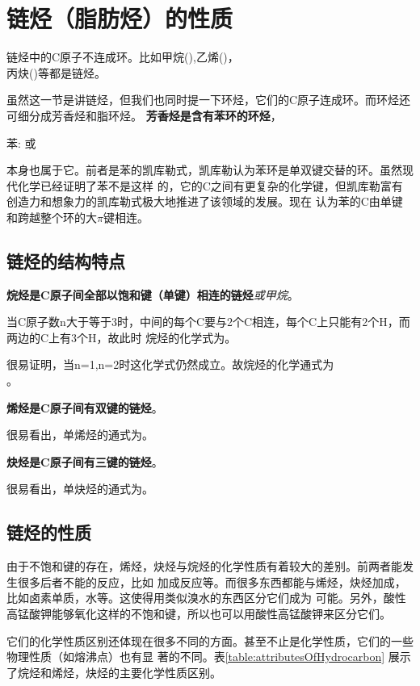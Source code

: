 \section{链烃（脂肪烃）的性质}
链烃中的C原子不连成环。比如甲烷(),乙烯()，\\
丙炔()等都是链烃。

虽然这一节是讲链烃，但我们也同时提一下环烃，它们的C原子连成环。而环烃还可细分成芳香烃和脂环烃。
\textbf{芳香烃是含有苯环的环烃}，
\begin{center}
苯:  或 
\end{center}
本身也属于它。前者是苯的凯库勒式，凯库勒认为苯环是单双键交替的环。虽然现代化学已经证明了苯不是这样
的，它的C之间有更复杂的化学键，但凯库勒富有创造力和想象力的凯库勒式极大地推进了该领域的发展。现在
认为苯的C由单键和跨越整个环的大$\pi$键相连。

\subsection{链烃的结构特点}
\textbf{烷烃是C原子间全部以饱和键（单键）相连的链烃}\emph{或甲烷}。

当C原子数n大于等于3时，中间的每个C要与2个C相连，每个C上只能有2个H，而两边的C上有3个H，故此时
烷烃的化学式为。

很易证明，当n=1,n=2时这化学式仍然成立。故烷烃的化学通式为\\
。

\textbf{烯烃是C原子间有双键的链烃}。

很易看出，单烯烃的通式为。

\textbf{炔烃是C原子间有三键的链烃}。

很易看出，单炔烃的通式为。

\subsection{链烃的性质}
由于不饱和键的存在，烯烃，炔烃与烷烃的化学性质有着较大的差别。前两者能发生很多后者不能的反应，比如
加成反应等。而很多东西都能与烯烃，炔烃加成，比如卤素单质，水等。这使得用类似溴水的东西区分它们成为
可能。另外，酸性高锰酸钾能够氧化这样的不饱和键，所以也可以用酸性高锰酸钾来区分它们。

它们的化学性质区别还体现在很多不同的方面。甚至不止是化学性质，它们的一些物理性质（如熔沸点）也有显
著的不同。表\ref{table:attributesOfHydrocarbon} 展示了烷烃和烯烃，炔烃的主要化学性质区别。

